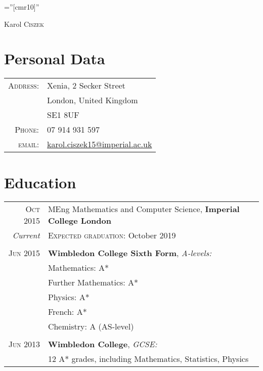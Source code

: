 \documentclass[a4paper,10pt]{article}
\begin{document}

\pagestyle{empty} %

\font\fb=''[cmr10]'' %

\par{\centering
		{\Huge Karol \textsc{Ciszek}
	}\bigskip\par}

\section{Personal Data}

\begin{tabular}{rl}
    \textsc{Address:} & Xenia, 2 Secker Street\\
                      & London, United Kingdom\\
                      & SE1 8UF\\
    \textsc{Phone:}   & 07 914 931 597\\
    \textsc{email:}   & \href{mailto:karol.ciszek15@imperial.ac.uk}{karol.ciszek15@imperial.ac.uk}
\end{tabular}

\section{Education}
\begin{tabular}{rl}	
    \textsc{Oct} 2015 & MEng Mathematics and Computer Science, \textbf{Imperial College London}\\
    \emph{Current}    & \textsc{Expected graduation}: October 2019\\&\\
    \textsc{Jun} 2015 & \textbf{Wimbledon College Sixth Form}, \emph{A-levels:}\\
                      & Mathematics: A*\\
                      & Further Mathematics: A*\\
                      & Physics: A*\\
                      & French: A*\\
                      & Chemistry: A (AS-level)\\&\\
    \textsc{Jun} 2013 & \textbf{Wimbledon College}, \emph{GCSE:}\\
                      & 12 A* grades, including Mathematics, Statistics, Physics
\end{tabular}
\end{document}
